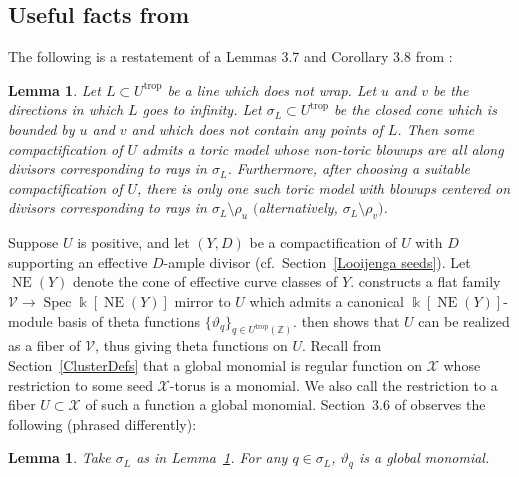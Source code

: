 \documentclass[pdftex]{sigma}
\numberwithin{equation}{section}
\numberwithin{figure}{section}
\numberwithin{table}{section}
\DeclareMathOperator{\Spec}{Spec}
\DeclareMathOperator{\NE}{NE}
\DeclareMathOperator{\trop}{trop}
\let\bb=\mathbb
\let\rar=\rightarrow
\let\s=\mathcal
\newcommand {\kk} {\Bbbk}
\newtheorem{lem}[thm]{Lemma}
\theoremstyle{definition}
\begin{document}
\subsection{Useful facts from \cite{Man1}}\label{Man}
The following is a restatement of a Lemmas 3.7 and Corollary 3.8 from \cite{Man1}:

\begin{lem}\label{model}
Let $L\subset U^{\trop}$ be a line which does not wrap. Let $u$ and $v$ be the directions in which $L$ goes to infinity. Let $\sigma_L\subset U^{\trop}$ be the closed cone which is bounded by $u$ and $v$ and which does not contain any points of $L$. Then some compactification of $U$ admits a toric model whose non-toric blowups are all along divisors corresponding to rays in $\sigma_L$. Furthermore, after choosing a suitable compactification of $U$, there is only one such toric model with blowups centered on divisors corresponding to rays in $\sigma_L \setminus \rho_u$ $($alternatively, $\sigma_L \setminus \rho_v)$.
\end{lem}

Suppose $U$ is positive, and let $(Y,D)$ be a compactification of $U$ with $D$ supporting an effective $D$-ample divisor (cf.\ Section~\ref{Looijenga seeds}). Let $\NE(Y)$ denote the cone of effective curve classes of $Y$. \cite{GHK1} constructs a flat family $\s{V}\rar \Spec \kk[\NE(Y)]$ mirror to $U$ which admits a canonical $\kk[\NE(Y)]$-module basis of theta functions $\{\vartheta_q\}_{q\in U^{\trop}(\bb{Z})}$. \cite{GHK2} then shows that $U$ can be realized as a fiber of $\s{V}$, thus giving theta functions on $U$. Recall from Section~\ref{ClusterDefs} that a global monomial is regular function on $\s{X}$ whose restriction to some seed $\s{X}$-torus is a monomial. We also call the restriction to a fiber $U\subset \s{X}$ of such a function a global monomial. Section~3.6 of \cite{Man1} observes the following (phrased differently):

\begin{lem}\label{GlobalMonomial}Take $\sigma_L$ as in Lemma~{\rm \ref{model}}. For any $q\in \sigma_L$, $\vartheta_q$ is a global monomial.
\end{lem}
\end{document}
